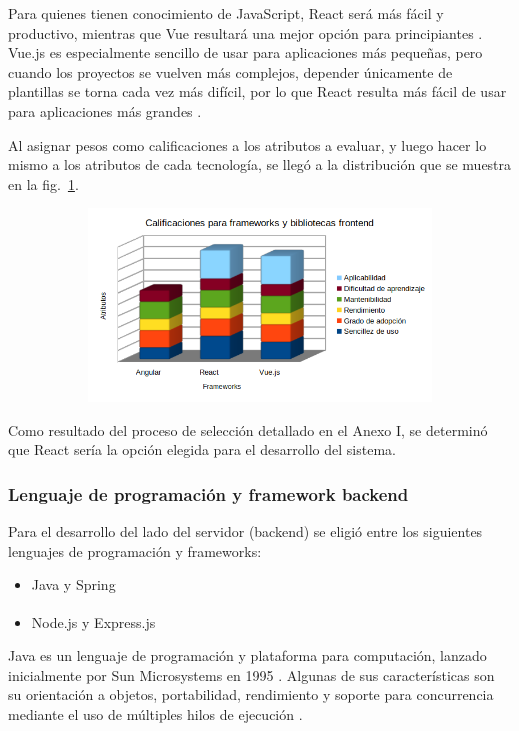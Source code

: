 \documentclass{article}
\begin{document}
Para quienes tienen conocimiento de JavaScript, React será más fácil y productivo, mientras que Vue resultará una mejor opción para principiantes \parencite{digitalya}. Vue.js es especialmente sencillo de usar para aplicaciones más pequeñas, pero cuando los proyectos se vuelven más complejos, depender únicamente de plantillas se torna cada vez más difícil, por lo que React resulta más fácil de usar para aplicaciones más grandes \parencite{stxnext}.

Al asignar pesos como calificaciones a los atributos a evaluar, y luego hacer lo mismo a los atributos de cada tecnología, se llegó a la distribución que se muestra en la fig.~\ref{fig:frameworksFrontend}.
\begin{figure}[H]
	\caption{Calificaciones para frameworks frontend}
    \begin{subfigure}{1\textwidth}
	\includegraphics[width=1\textwidth]{calificaciones para frameworks frontend.png}
    \end{subfigure}
	\label{fig:frameworksFrontend}
\end{figure}
\vspace{-1.0\baselineskip}
Como resultado del proceso de selección detallado en el Anexo I, se determinó que React sería la opción elegida para el desarrollo del sistema.
\subsubsection{Lenguaje de programación y framework backend}
Para el desarrollo del lado del servidor (backend) se eligió entre los siguientes lenguajes de programación y frameworks:
\begin{itemize}
    \item Java y Spring
    \item Node.js\textsuperscript{\textregistered} y Express.js
\end{itemize}
Java es un lenguaje de programación y plataforma para computación, lanzado inicialmente por Sun Microsystems en 1995 \parencite{whatIsJava}. Algunas de sus características son su orientación a objetos, portabilidad, rendimiento y soporte para concurrencia mediante el uso de múltiples hilos de ejecución \parencite{featuresJava}.
\end{document}
